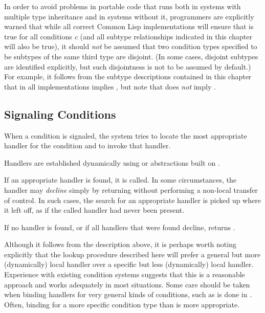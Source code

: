 In order to avoid problems in portable code that runs both in systems with
multiple type inheritance and in systems without it, programmers are explicitly
warned that while all correct Common Lisp implementations will ensure that
is true for all conditions \emph{c} (and all subtype relationships indicated in this
chapter will also be true), it should \emph{not} be assumed that two condition
types specified to be subtypes of the same third type are disjoint.
(In some cases,
disjoint subtypes are identified explicitly, but such disjointness is not to be assumed by
default.)  For example, it follows from the subtype descriptions contained in
this chapter that in all implementations
 implies ,
but note that
 does \emph{not}
imply .


\subsection{Signaling Conditions}

When a condition is signaled, the system tries to locate the most appropriate
handler for the condition and to invoke that handler.

Handlers are established dynamically using  or abstractions built
on .

If an appropriate handler is found, it is called. In some circumstances, 
the handler may \emph{decline} simply by returning without performing a 
non-local transfer of control. In such cases, the search for an 
appropriate handler is picked up where it left off, as if the called 
handler had never been present.

If no handler is found, or if all handlers that were found decline,
 returns .

Although it follows from the description above, it is perhaps worth noting
explicitly that the lookup procedure described here will prefer a general 
but more (dynamically) local handler over a specific but less (dynamically)
local handler. Experience with existing condition systems suggests that
this is a reasonable approach and works adequately in most situations. 
Some care should be taken when binding handlers for very general kinds of
conditions, such as is done in . Often, binding for a more
specific condition type than  is more appropriate.

